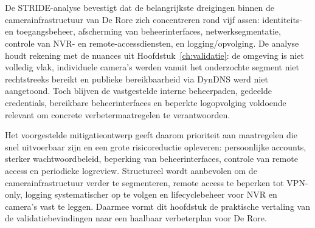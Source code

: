 \section{}%
\label{sec:threatmodel-samenvatting}

De STRIDE-analyse bevestigt dat de belangrijkste dreigingen binnen de camerainfrastructuur van De Rore zich concentreren rond vijf assen: identiteits- en toegangsbeheer, afscherming van beheerinterfaces, netwerksegmentatie, controle van NVR- en remote-accessdiensten, en logging/opvolging. De analyse houdt rekening met de nuances uit Hoofdstuk~\ref{ch:validatie}: de omgeving is niet volledig vlak, individuele camera's werden vanuit het onderzochte segment niet rechtstreeks bereikt en publieke bereikbaarheid via DynDNS werd niet aangetoond. Toch blijven de vastgestelde interne beheerpaden, gedeelde credentials, bereikbare beheerinterfaces en beperkte logopvolging voldoende relevant om concrete verbetermaatregelen te verantwoorden.

Het voorgestelde mitigatieontwerp geeft daarom prioriteit aan maatregelen die snel uitvoerbaar zijn en een grote risicoreductie opleveren: persoonlijke accounts, sterker wachtwoordbeleid, beperking van beheerinterfaces, controle van remote access en periodieke logreview. Structureel wordt aanbevolen om de camerainfrastructuur verder te segmenteren, remote access te beperken tot VPN-only, logging systematischer op te volgen en lifecyclebeheer voor NVR en camera's vast te leggen. Daarmee vormt dit hoofdstuk de praktische vertaling van de validatiebevindingen naar een haalbaar verbeterplan voor De Rore.
